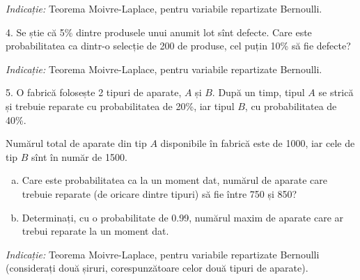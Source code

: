 \emph{Indicație:} Teorema Moivre-Laplace, pentru variabile repartizate
Bernoulli.

\vspace{0.3cm}

4. Se știe că 5\% dintre produsele unui anumit lot sînt defecte. Care
este probabilitatea ca dintr-o selecție de 200 de produse, cel puțin
10\% să fie defecte?

\emph{Indicație:} Teorema Moivre-Laplace, pentru variabile repartizate
Bernoulli.

\vspace{0.3cm}

5. O fabrică folosește 2 tipuri de aparate, $ A $ și $ B $.
După un timp, tipul $ A $ se strică și trebuie reparate cu probabilitatea de 20\%,
iar tipul $ B $, cu probabilitatea de 40\%.

Numărul total de aparate din tip $ A $ disponibile în fabrică este de 1000,
iar cele de tip $ B $ sînt în număr de 1500.

\begin{enumerate}[(a)]
\item Care este probabilitatea ca la un moment dat, numărul de aparate care
  trebuie reparate (de oricare dintre tipuri) să fie între 750 și 850?
\item Determinați, cu o probabilitate de 0.99, numărul maxim de aparate care
  ar trebui reparate la un moment dat.
\end{enumerate}

\emph{Indicație:} Teorema Moivre-Laplace, pentru variabile repartizate
Bernoulli (considerați două șiruri, corespunzătoare celor două tipuri
de aparate).


